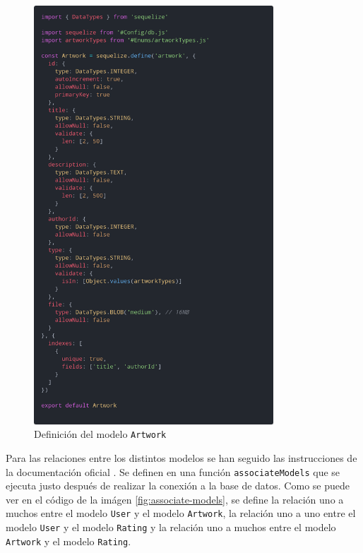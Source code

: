 \begin{figure}[H]
  \centering
  \includegraphics[width=0.8\textwidth]{img/artwork-model}
  \caption{Definición del modelo \texttt{Artwork}}
  \label{fig:artwork-model}
\end{figure}

Para las relaciones entre los distintos modelos se han seguido las instrucciones
de la documentación oficial \cite{sequelize-associations}. Se definen en una función
\texttt{associateModels} que se ejecuta justo después de realizar la conexión a la base
de datos. Como se puede ver en el código de la imágen \ref{fig:associate-models}, se
define la relación uno a muchos entre el modelo \texttt{User} y el modelo \texttt{Artwork},
la relación uno a uno entre el modelo \texttt{User} y el modelo \texttt{Rating} y la
relación uno a muchos entre el modelo \texttt{Artwork} y el modelo \texttt{Rating}.

